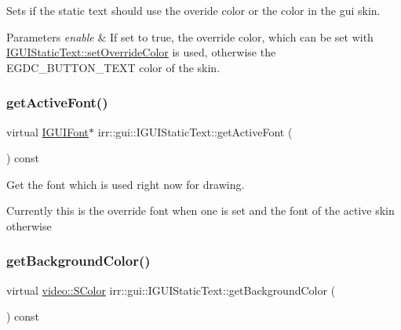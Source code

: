 Sets if the static text should use the overide color or the color in the gui skin. 


\begin{DoxyParams}{Parameters}
{\em enable} & If set to true, the override color, which can be set with \hyperlink{classirr_1_1gui_1_1IGUIStaticText_aadc1f0e10e4b298944e6dcfd49e54009}{I\+G\+U\+I\+Static\+Text\+::set\+Override\+Color} is used, otherwise the E\+G\+D\+C\+\_\+\+B\+U\+T\+T\+O\+N\+\_\+\+T\+E\+XT color of the skin. \\
\hline
\end{DoxyParams}
\mbox{\label{classirr_1_1gui_1_1IGUIStaticText_aef001eb5d0e13b5b6d1efead606605c2}} 
\subsubsection{\texorpdfstring{get\+Active\+Font()}{getActiveFont()}}
{\footnotesize\ttfamily virtual \hyperlink{classirr_1_1gui_1_1IGUIFont}{I\+G\+U\+I\+Font}$\ast$ irr\+::gui\+::\+I\+G\+U\+I\+Static\+Text\+::get\+Active\+Font (\begin{DoxyParamCaption}{ }\end{DoxyParamCaption}) const\hspace{0.3cm}{\ttfamily [pure virtual]}}



Get the font which is used right now for drawing. 

Currently this is the override font when one is set and the font of the active skin otherwise \mbox{\label{classirr_1_1gui_1_1IGUIStaticText_a7149fff0b2c4159503f114807e0b0a83}} 
\subsubsection{\texorpdfstring{get\+Background\+Color()}{getBackgroundColor()}}
{\footnotesize\ttfamily virtual \hyperlink{classirr_1_1video_1_1SColor}{video\+::\+S\+Color} irr\+::gui\+::\+I\+G\+U\+I\+Static\+Text\+::get\+Background\+Color (\begin{DoxyParamCaption}{ }\end{DoxyParamCaption}) const\hspace{0.3cm}{\ttfamily [pure virtual]}}




